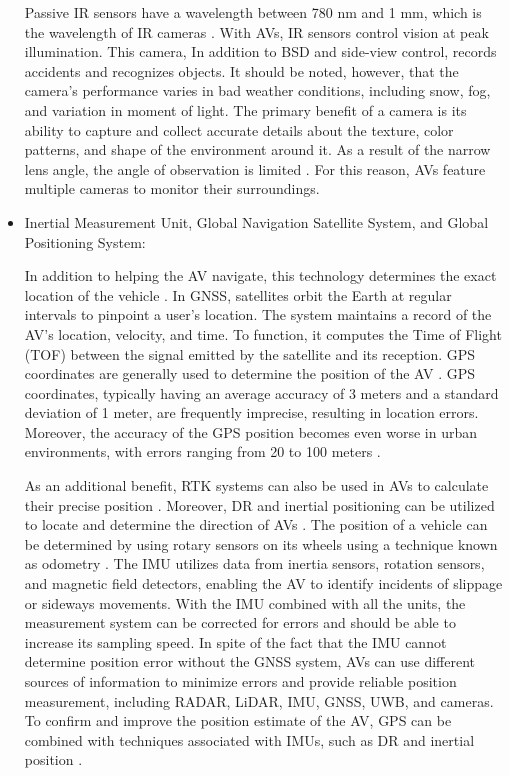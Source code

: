 \documentclass[a4paper,12pt]{article}
\begin{document}
\begin{itemize}
\hspace{5mm} Passive IR sensors have a wavelength between 780 nm and 1 mm, which is the wavelength of IR cameras \cite{article24}. With AVs, IR sensors control vision at peak illumination. This camera, In addition to BSD and side-view control,  records accidents and recognizes objects. It should be noted, however, that the camera's performance varies in bad weather conditions, including snow, fog, and variation in moment of light. The primary benefit of a camera is its ability to capture and collect accurate details about the texture, color patterns, and shape of the environment around it. As a result of the narrow lens angle, the angle of observation is limited \cite{article24}. For this reason, AVs feature multiple cameras to monitor their surroundings.

  \item Inertial Measurement Unit, Global Navigation Satellite System, and Global Positioning System:

\hspace{5mm} In addition to helping the AV navigate, this technology determines the exact location of the vehicle \cite{article24}. In GNSS, satellites orbit the Earth at regular intervals to pinpoint a user's location. The system maintains a record of the AV's location, velocity, and time. To function, it computes the Time of Flight (TOF) between the signal emitted by the satellite and its reception. GPS coordinates are generally used to determine the position of the AV \cite{article24}. GPS coordinates, typically having an average accuracy of 3 meters and a standard deviation of 1 meter, are frequently imprecise, resulting in location errors. Moreover, the accuracy of the GPS position becomes even worse in urban environments, with errors ranging from 20 to 100 meters \cite{article24}.


\hspace{5mm} As an additional benefit, RTK systems can also be used in AVs to calculate their precise position \cite{article24}. Moreover, DR and inertial positioning can be utilized to locate and determine the direction of AVs \cite{article24}. The position of a vehicle can be determined by using rotary sensors on its wheels using a technique known as odometry \cite{article24}. The IMU utilizes data from inertia sensors, rotation sensors, and magnetic field detectors, enabling the AV to identify incidents of slippage or sideways movements. With the IMU combined with all the units, the measurement system can be corrected for errors and should be able to increase its sampling speed. In spite of the fact that the IMU cannot determine position error without the GNSS system, AVs can use different sources of information to minimize errors and provide reliable position measurement, including RADAR, LiDAR, IMU, GNSS, UWB, and cameras. To confirm and improve the position estimate of the AV, GPS can be combined with techniques associated with IMUs, such as DR and inertial position \cite{article24}.


\end{itemize}
\end{document}
